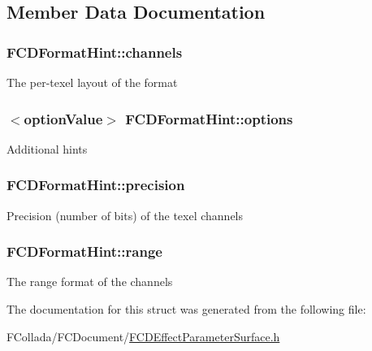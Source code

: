 \subsection{Member Data Documentation}
\hypertarget{structFCDFormatHint_acfb2c3d8e09bcb65430d2d733ee2023c}{
\subsubsection[{channels}]{ {\bf FCDFormatHint::channels}}}
\label{structFCDFormatHint_acfb2c3d8e09bcb65430d2d733ee2023c}
The per-\/texel layout of the format \hypertarget{structFCDFormatHint_aaa86d7af04b996fb90c551b2d401a0be}{
\subsubsection[{options}]{$<${\bf optionValue}$>$ {\bf FCDFormatHint::options}}}
\label{structFCDFormatHint_aaa86d7af04b996fb90c551b2d401a0be}
Additional hints \hypertarget{structFCDFormatHint_ab9648a25aadd4c375d3b574f3c980d74}{
\subsubsection[{precision}]{ {\bf FCDFormatHint::precision}}}
\label{structFCDFormatHint_ab9648a25aadd4c375d3b574f3c980d74}
Precision (number of bits) of the texel channels \hypertarget{structFCDFormatHint_ab999301788a29244f9b81e9dd6fe4277}{
\subsubsection[{range}]{ {\bf FCDFormatHint::range}}}
\label{structFCDFormatHint_ab999301788a29244f9b81e9dd6fe4277}
The range format of the channels 

The documentation for this struct was generated from the following file:\begin{DoxyCompactItemize}
\item 
FCollada/FCDocument/\hyperlink{FCDEffectParameterSurface_8h}{FCDEffectParameterSurface.h}\end{DoxyCompactItemize}

